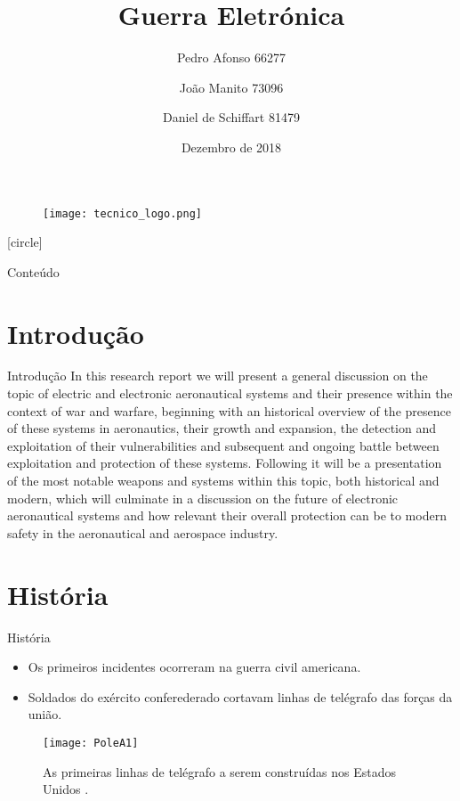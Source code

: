 \documentclass[portuguese,10pt]{beamer}
\title[Guerra Eletrónica]{Guerra Eletrónica}
\author[MEAer -- Sistemas Aviónicos Integrados]{Pedro Afonso 66277 \and João Manito 73096 \and Daniel de Schiffart 81479}
\institute{Sistemas Aviónicos Integrados}
\date{Dezembro de 2018}
\begin{document}
\begin{frame}
    \begin{figure}
	\texttt{[image: tecnico\_logo.png]}
    \end{figure}
    \titlepage
\end{frame}

[circle]

\begin{frame}{Conteúdo}
  \tableofcontents
\end{frame}

\section{Introdução}

\begin{frame}{Introdução}
    In this research report we will present a general discussion on the topic of electric and electronic aeronautical systems and their presence within the context of war and warfare, beginning with an historical overview of the presence of these systems in aeronautics, their growth and expansion, the detection and exploitation of their vulnerabilities and subsequent and ongoing battle between exploitation and protection of these systems. Following it will be a presentation of the most notable weapons and systems within this topic, both historical and modern, which will culminate in a discussion on the future of electronic aeronautical systems and how relevant their overall protection can be to modern safety in the aeronautical and aerospace industry.
\end{frame}

\section{História}

\begin{frame}{História}
    \begin{itemize}
        \item Os primeiros incidentes ocorreram na guerra civil americana.
        \pause
        \item Soldados do exército conferederado cortavam linhas de telégrafo das forças da união.
    \end{itemize}
    \begin{figure}[]
        \centering
        \texttt{[image: PoleA1]}
        \caption{As primeiras linhas de telégrafo a serem construídas nos Estados Unidos \cite{polea1}.}
        \label{fig:polea1}
    \end{figure}
\end{frame}
\end{document}
